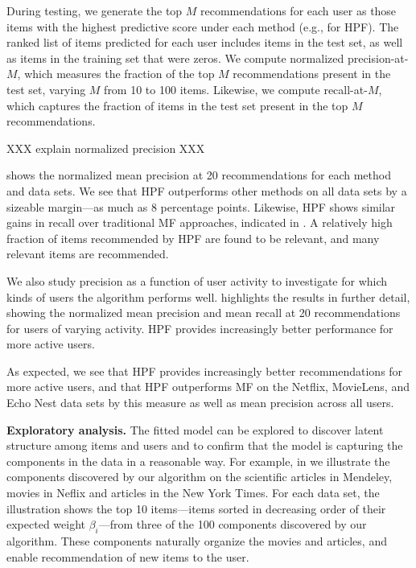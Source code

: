 
During testing, we generate the top $M$ recommendations for each user
as those items with the highest predictive score under each method
(e.g.,  for HPF). The ranked list of items predicted for
each user includes items in the test set, as well as items in the
training set that were zeros. We compute normalized precision-at-$M$,
which measures the fraction of the top $M$ recommendations present in
the test set, varying $M$ from 10 to 100 items. Likewise, we compute
recall-at-$M$, which captures the fraction of items in the test set
present in the top $M$ recommendations.

XXX explain normalized precision XXX

 shows the normalized mean precision at 20
recommendations for each method and data sets. We see that HPF
outperforms other methods on all data sets by a sizeable margin---as
much as 8 percentage points. Likewise, HPF shows similar gains in
recall over traditional MF approaches, indicated in
. A relatively high fraction of items recommended
by HPF are found to be relevant, and many relevant items are
recommended.

We also study precision as a function of user activity to investigate
for which kinds of users the algorithm performs
well.  highlights the results
in further detail, showing the normalized mean precision and mean
recall at 20 recommendations for users of varying activity. HPF
provides increasingly better performance for more active users.

As expected, we see that HPF provides increasingly better
recommendations for more active users, and that HPF outperforms MF on
the Netflix, MovieLens, and Echo Nest data sets by this measure as
well as mean precision across all users.


{\bf Exploratory analysis.} The fitted model can be explored to
discover latent structure among items and users and to confirm that
the model is capturing the components in the data in a reasonable
way. For example, in  we illustrate the components
discovered by our algorithm on the scientific articles in Mendeley,
movies in Neflix and articles in the New York Times. For each data
set, the illustration shows the top 10 items---items sorted in
decreasing order of their expected weight $\beta_i$---from three of
the 100 components discovered by our algorithm. These components
naturally organize the movies and articles, and enable recommendation
of new items to the user.

